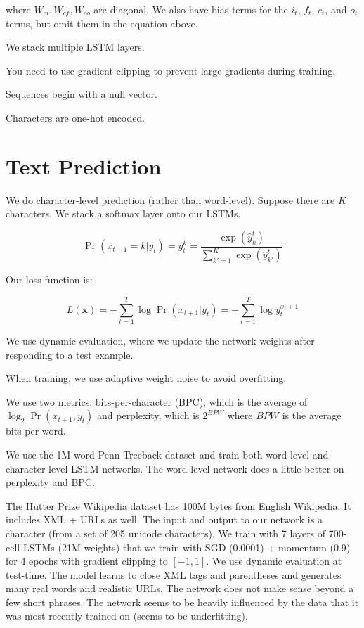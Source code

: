 \documentclass[a4paper]{article}
\begin{document}
where $W_{ci}, W_{cf}, W_{co}$ are diagonal. We also have bias terms for
the $i_t$, $f_t$, $c_t$, and $o_t$ terms, but omit them in the equation above.

We stack multiple LSTM layers.

You need to use gradient clipping to prevent large gradients during training.

Sequences begin with a null vector.

Characters are one-hot encoded.

\section{Text Prediction}
We do character-level prediction (rather than word-level). Suppose there are
$K$ characters. We stack a softmax layer onto our LSTMs.

$$
\Pr(x_{t+1} = k | y_t) = y_t^k = \frac{\exp(\hat{y}^t_k)}{\sum_{k'=1}^{K}{
\exp(\hat{y}^t_{k'})
}}
$$

Our loss function is:

$$
L(\mathbf{x}) = -\sum_{t=1}^T{\log \Pr(x_{t+1} | y_t)}
= -\sum_{t=1}^T{\log y_t^{x_t + 1}}
$$

We use dynamic evaluation, where we update the network weights after responding
to a test example.

When training, we use adaptive weight noise to avoid overfitting.

We use two metrics: bits-per-character (BPC), which is the average of
$\log_2 \Pr(x_{t+1}, y_t)$ and perplexity, which is $2^{BPW}$ where $BPW$ is
the average bits-per-word.

We use the 1M word Penn Treeback dataset and train both word-level and
character-level LSTM networks. The word-level network does a little better
on perplexity and BPC.

The Hutter Prize Wikipedia dataset has 100M bytes from English Wikipedia. It
includes XML + URLs as well. The input and output to our network is a character
(from a set of 205 unicode characters). We train with 7 layers of 700-cell
LSTMs (21M weights) that we train with SGD (0.0001) + momentum (0.9) for
4 epochs with gradient clipping to $[-1, 1]$. We use dynamic evaluation
at test-time. The model learns to close XML tags and parentheses and generates
many real words and realistic URLs. The network does not make sense beyond
a few short phrases. The network seems to be heavily influenced by the data
that it was most recently trained on (seems to be underfitting).
\end{document}
